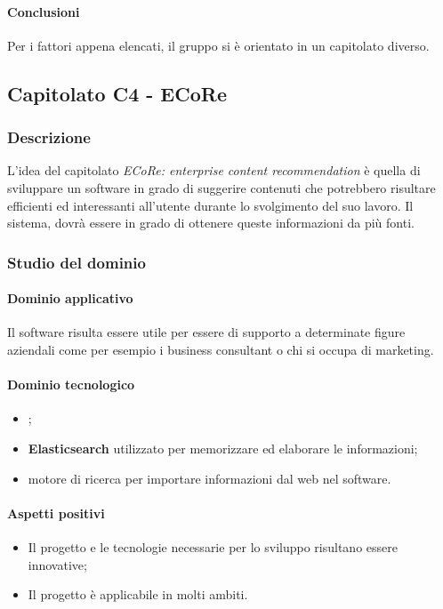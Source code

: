 	\paragraph{Conclusioni} \Spazio
	Per i fattori appena elencati, il gruppo si è orientato in un capitolato diverso.
	
	\subsection{Capitolato C4 - ECoRe}
	\subsubsection{Descrizione}
    L'idea del capitolato \emph{ECoRe: enterprise content recommendation} è quella di sviluppare un software in grado di suggerire contenuti che potrebbero risultare efficienti ed interessanti all'utente durante lo svolgimento del suo lavoro. Il sistema, dovrà essere in grado di ottenere queste informazioni da più fonti.
	
	\subsubsection{Studio del dominio} 
	\paragraph{Dominio applicativo} \Spazio
	Il software risulta essere utile per essere di supporto a determinate figure aziendali come per esempio i business consultant o chi si occupa di marketing.
	\paragraph{Dominio tecnologico}
		\begin{itemize}
		\item \textbf{}; 
		\item \textbf{Elasticsearch} utilizzato per memorizzare ed elaborare le informazioni;
		\item \textbf{} motore di ricerca per importare informazioni dal web nel software.
	\end{itemize}
	
	\paragraph{Aspetti positivi} \Spazio
	\begin{itemize}
		\item Il progetto e le tecnologie necessarie per lo sviluppo risultano essere innovative;
		\item Il progetto è applicabile in molti ambiti.
	\end{itemize}
